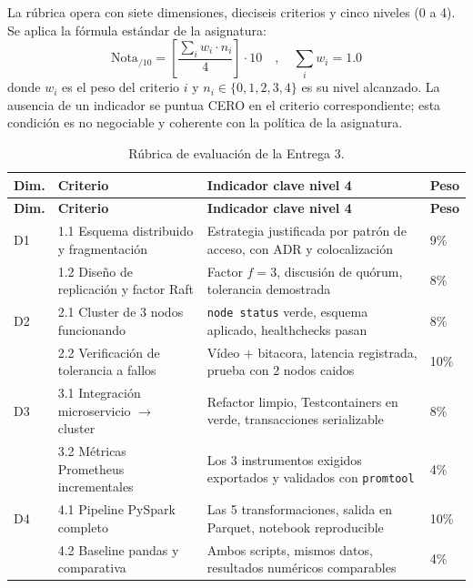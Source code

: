\documentclass[11pt,a4paper]{article}
\begin{document}
    La rúbrica opera con siete dimensiones, dieciseis criterios y cinco niveles (0 a 4). Se aplica la fórmula estándar de la asignatura:
    \begin{equation}
        \text{Nota}_{/10} = \left[ \frac{\sum_i w_i \cdot n_i}{4} \right] \cdot 10 \quad , \quad \sum_i w_i = 1.0
        \label{eq:nota}
    \end{equation}
    donde $w_i$ es el peso del criterio $i$ y $n_i \in \{0,1,2,3,4\}$ es su nivel alcanzado. La ausencia de un indicador se puntua CERO en el criterio correspondiente; esta condición es no negociable y coherente con la política de la asignatura.

    \renewcommand{\arraystretch}{1.2}
    \small
    \begin{xltabular}{\linewidth}{@{}p{0.9cm} p{4.6cm} X p{1cm}@{}}
        \caption{Rúbrica de evaluación de la Entrega 3.}
        \label{tab:rúbrica-e3}\\
        \toprule
        \textbf{Dim.} & \textbf{Criterio} & \textbf{Indicador clave nivel 4} & \textbf{Peso}\\
        \midrule
        \endfirsthead
        \toprule
        \textbf{Dim.} & \textbf{Criterio} & \textbf{Indicador clave nivel 4} & \textbf{Peso}\\
        \midrule
        \endhead
        \bottomrule
        \endfoot
        D1 & 1.1 Esquema distribuido y fragmentación & Estrategia justificada por patrón de acceso, con ADR y colocalización & 9\%\\
           & 1.2 Diseño de replicación y factor Raft & Factor $f=3$, discusión de quórum, tolerancia demostrada & 8\%\\
        D2 & 2.1 Cluster de 3 nodos funcionando & \texttt{node status} verde, esquema aplicado, healthchecks pasan & 8\%\\
           & 2.2 Verificación de tolerancia a fallos & Vídeo + bitacora, latencia registrada, prueba con 2 nodos caidos & 10\%\\
        D3 & 3.1 Integración microservicio $\to$ cluster & Refactor limpio, Testcontainers en verde, transacciones serializable & 8\%\\
           & 3.2 Métricas Prometheus incrementales & Los 3 instrumentos exigidos exportados y validados con \texttt{promtool} & 4\%\\
        D4 & 4.1 Pipeline PySpark completo & Las 5 transformaciones, salida en Parquet, notebook reproducible & 10\%\\
           & 4.2 Baseline pandas y comparativa & Ambos scripts, mismos datos, resultados numéricos comparables & 4\%\\

\end{xltabular}
\end{document}
